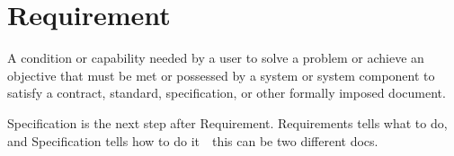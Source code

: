 \section{Requirement}
\label{sec:Requirement}

A condition or capability needed by a user to solve a problem or achieve an objective that must be met or possessed by a system or system component to satisfy a contract, standard, specification, or other formally imposed document.

Specification is the next step after Requirement. Requirements tells what to do, and Specification tells how to do it~\textemdash~this can be two different docs.
